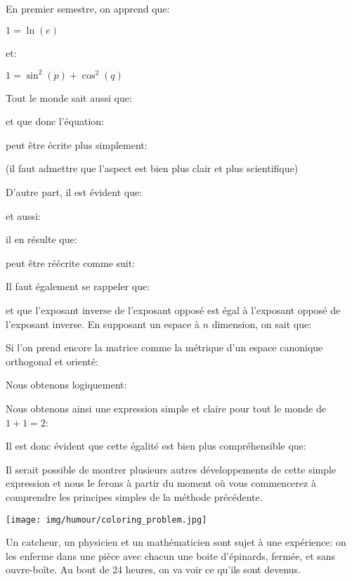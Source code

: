 	En premier semestre, on apprend que:
	\begin{center}
	$1=\ln(e)$  
	\end{center}
	
	et:
	\begin{center}
	$1=\sin^2(p)+\cos^2(q)$  
	\end{center}
	
	Tout le monde sait aussi que:
	
	
	et que donc l'équation:
	
	
	peut être écrite plus simplement:
	
	
	(il faut admettre que l'aspect est bien plus clair et plus scientifique)

	D'autre part, il est évident que:
	
	
	et aussi:
	
	
	il en résulte que:
	
	
	peut être réécrite comme suit:
	
	
	Il faut également se rappeler que:
	
	et que l'exposant inverse de l'exposant opposé est égal à l'exposant opposé de l'exposant inverse. En supposant un espace à $n$ dimension, on sait que:
	
	Si l'on prend encore la matrice comme la métrique d'un espace canonique orthogonal et orienté:
	
	
	Nous obtenons logiquement:
	
	Nous obtenons ainsi une expression simple et claire pour tout le monde de $1+1=2$:
	
	
	Il est donc évident que cette égalité est bien plus compréhensible que:
	
	Il serait possible de montrer plusieurs autres développements de cette simple expression et nous le ferons à partir du moment où vous commencerez à comprendre les principes simples de la méthode précédente.
	
	\begin{center}\underline{\hspace{5 cm}}\end{center}

	\begin{center}
		\texttt{[image: img/humour/coloring\_problem.jpg]}	
	\end{center}

	Un catcheur, un physicien et un mathématicien sont sujet à une expérience: on les enferme dans une pièce avec chacun une boite d'épinards, fermée, et sans ouvre-boîte. Au bout de 24 heures, on va voir ce qu'ils sont devenus. 
	
